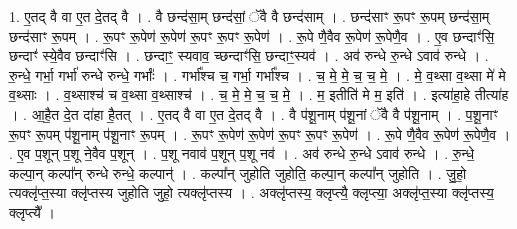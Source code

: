 \documentclass[17pt]{extarticle}
\begin{document}
1. ए॒तद् वै वा ए॒त दे॒तद् वै । . वै छन्द॑सा॒म् छन्द॑सां॒ ॅवै वै छन्द॑साम् । . छन्द॑साꣳ रू॒पꣳ रू॒पम् छन्द॑सा॒म् छन्द॑साꣳ रू॒पम् । . रू॒पꣳ रू॒पेण॑ रू॒पेण॑ रू॒पꣳ रू॒पꣳ रू॒पेण॑ । . रू॒पे णै॒वैव रू॒पेण॑ रू॒पेणै॒व । . ए॒व छन्दाꣳ॑सि॒ छन्दाꣳ॑ स्ये॒वैव छन्दाꣳ॑सि । . छन्दाꣳ॒ स्यवाव॒ च्छन्दाꣳ॑सि॒ छन्दाꣳ॒स्यव॑ । . अव॑ रुन्धे रु॒न्धे ऽवाव॑ रुन्धे । . रु॒न्धे॒ गर्भा॒ गर्भा॑ रुन्धे रुन्धे॒ गर्भाः᳚ । . गर्भा᳚श्च च॒ गर्भा॒ गर्भा᳚श्च । . च॒ मे॒ मे॒ च॒ च॒ मे॒ । . मे॒ व॒थ्सा व॒थ्सा मे॑ मे व॒थ्साः । . व॒थ्साश्च॑ च व॒थ्सा व॒थ्साश्च॑ । . च॒ मे॒ मे॒ च॒ च॒ मे॒ । . म॒ इतीति॑ मे म॒ इति॑ । . इत्या॑हा॒हे तीत्या॑ह । . आ॒है॒त दे॒त दा॑हा है॒तत् । . ए॒तद् वै वा ए॒त दे॒तद् वै । . वै प॑शू॒नाम् प॑शू॒नां ॅवै वै प॑शू॒नाम् । . प॒शू॒नाꣳ रू॒पꣳ रू॒पम् प॑शू॒नाम् प॑शू॒नाꣳ रू॒पम् । . रू॒पꣳ रू॒पेण॑ रू॒पेण॑ रू॒पꣳ रू॒पꣳ रू॒पेण॑ । . रू॒पे णै॒वैव रू॒पेण॑ रू॒पेणै॒व । . ए॒व प॒शून् प॒शू ने॒वैव प॒शून् । . प॒शू नवाव॑ प॒शून् प॒शू नव॑ । . अव॑ रुन्धे रु॒न्धे ऽवाव॑ रुन्धे । . रु॒न्धे॒ कल्पा॒न् कल्पा᳚न् रुन्धे रुन्धे॒ कल्पान्॑ । . कल्पा᳚न् जुहोति जुहोति॒ कल्पा॒न् कल्पा᳚न् जुहोति । . जु॒हो॒ त्यक्लृ॑प्त॒स्या क्लृ॑प्तस्य जुहोति जुहो॒ त्यक्लृ॑प्तस्य । . अक्लृ॑प्तस्य॒ क्लृप्त्यै॒ क्लृप्त्या॒ अक्लृ॑प्त॒स्या क्लृ॑प्तस्य॒ क्लृप्त्यै᳚ । \newline
\end{document}
